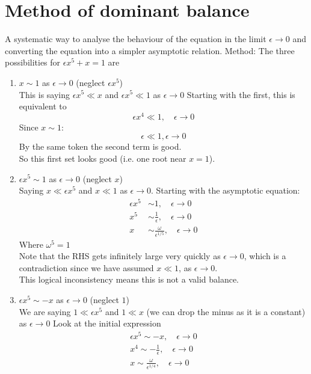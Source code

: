 \documentclass{/home/janmebows/Documents/LatexTemplates/myassignment}
\begin{document}
\section*{Method of dominant balance}
A systematic way to analyse the behaviour of the equation in the limit $\epsilon\to0$ and converting the equation into a simpler asymptotic relation.
Method:
The three possibilities for $\epsilon x^5 + x =1 $ are
\begin{enumerate}
    \item $x\sim 1$ as $\epsilon\to 0$ (neglect $\epsilon x^5$)\\
    This is saying $\epsilon x^5 \ll x$ and $\epsilon x^5 \ll 1$ as $\epsilon\to 0$
    Starting with the first, this is equivalent to
    \[\epsilon x^4 \ll 1, \quad \epsilon\to 0\]
    Since $x\sim 1$:
    \[\epsilon \ll 1, \epsilon\to 0\]
    By the same token the second term is good.\\
    So this first set looks good (i.e. one root near $x=1$).
    \item $\epsilon x^5 \sim 1$ as $\epsilon\to 0$ (neglect $x$)\\
    Saying $x \ll \epsilon x^5$ and $x\ll 1$ as $\epsilon\to0$. Starting with the asymptotic equation:
    \begin{align*}
        \epsilon x^5 &\sim 1,\quad \epsilon\to 0\\
        x^5 &\sim \frac1\epsilon, \quad \epsilon\to 0\\
        x &\sim \frac{\omega}{\epsilon^{1/5}}, \quad \epsilon\to 0
    \end{align*}
    Where $\omega^5 =1$\\
    Note that the RHS gets infinitely large very quickly as $\epsilon\to0$, which is a contradiction since we have assumed $x \ll 1$, as $\epsilon\to 0$.\\
    This logical inconsistency means this is not a valid balance.
    \item $\epsilon x^5 \sim -x$ as $\epsilon\to 0$ (neglect $1$)\\
    We are saying $1\ll \epsilon x^5$ and $1\ll x$ (we can drop the minus as it is a constant) as $\epsilon\to 0$ 
    Look at the initial expression
    \begin{align*}
        \epsilon x^5 \sim -x, \quad \epsilon\to 0\\
         x^4\sim -\frac{1}{\epsilon},\quad \epsilon\to0\\
         x \sim \frac{\omega}{\epsilon^{1/4}}, \quad \epsilon\to0
    \end{align*}

\end{enumerate}
\end{document}
